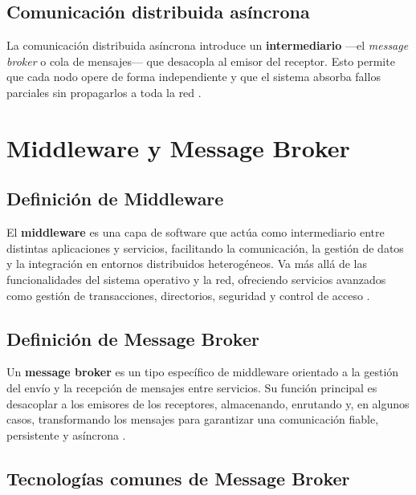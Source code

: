 \documentclass[12pt,a4paper]{article}
\begin{document}
\subsection{Comunicación distribuida asíncrona}
 
La comunicación distribuida asíncrona introduce un \textbf{intermediario} —el \textit{message broker} o cola de mensajes— que desacopla al emisor del receptor. Esto permite que cada nodo opere de forma independiente y que el sistema absorba fallos parciales sin propagarlos a toda la red \cite{ref17}.
 
\section{Middleware y Message Broker}
 
\subsection{Definición de Middleware}
 
El \textbf{middleware} es una capa de software que actúa como intermediario entre distintas aplicaciones y servicios, facilitando la comunicación, la gestión de datos y la integración en entornos distribuidos heterogéneos. Va más allá de las funcionalidades del sistema operativo y la red, ofreciendo servicios avanzados como gestión de transacciones, directorios, seguridad y control de acceso \cite{ref18}.
 
\subsection{Definición de Message Broker}
 
Un \textbf{message broker} es un tipo específico de middleware orientado a la gestión del envío y la recepción de mensajes entre servicios. Su función principal es desacoplar a los emisores de los receptores, almacenando, enrutando y, en algunos casos, transformando los mensajes para garantizar una comunicación fiable, persistente y asíncrona \cite{ref11}.
 
\subsection{Tecnologías comunes de Message Broker}
 
\end{document}
